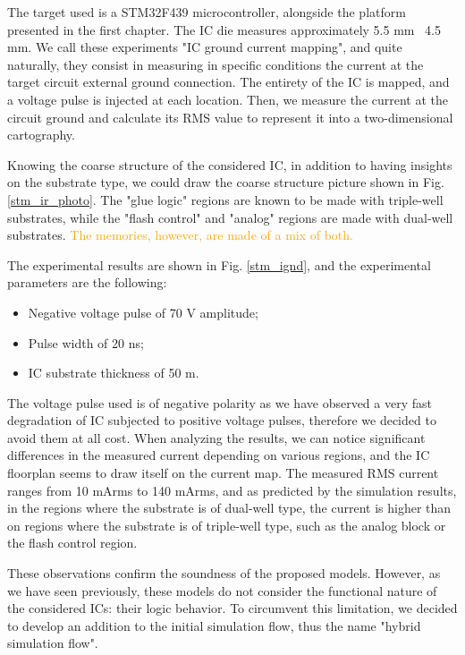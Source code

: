 	The target used is a STM32F439 microcontroller, alongside the platform presented in the first chapter.
	The IC die measures approximately 5.5 mm \texttimes\ 4.5 mm.
	We call these experiments "IC ground current mapping", and quite naturally, they consist in measuring in specific conditions the current at the target circuit external ground connection.
	The entirety of the IC is mapped, and a voltage pulse is injected at each location.
	Then, we measure the current at the circuit ground and calculate its RMS value to represent it into a two-dimensional cartography.
	
	Knowing the coarse structure of the considered IC, in addition to having insights on the substrate type, we could draw the coarse structure picture shown in Fig. \ref{stm_ir_photo}.
	The "glue logic" regions are known to be made with triple-well substrates, while the "flash control" and "analog" regions are made with dual-well substrates.
	\textcolor{orange}{The memories, however, are made of a mix of both.}
	
	The experimental results are shown in Fig. \ref{stm_ignd}, and the experimental parameters are the following:
	\begin{itemize}
		\item Negative voltage pulse of 70 V amplitude;
		\item Pulse width of 20 ns;
		\item IC substrate thickness of 50 \textmu m.
	\end{itemize}
	The voltage pulse used is of negative polarity as we have observed a very fast degradation of IC subjected to positive voltage pulses, therefore we decided to avoid them at all cost.
	When analyzing the results, we can notice significant differences in the measured current depending on various regions, and the IC floorplan seems to draw itself on the current map.
	The measured RMS current ranges from 10 mArms to 140 mArms, and as predicted by the simulation results, in the regions where the substrate is of dual-well type, the current is higher than on regions where the substrate is of triple-well type, such as the analog block or the flash control region.
	
	These observations confirm the soundness of the proposed models.
	However, as we have seen previously, these models do not consider the functional nature of the considered ICs: their logic behavior.
	To circumvent this limitation, we decided to develop an addition to the initial simulation flow, thus the name "hybrid simulation flow".